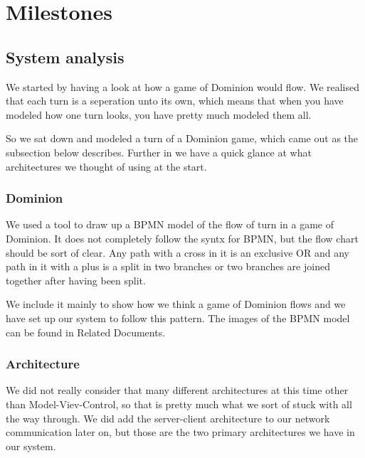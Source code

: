 \section{Milestones}
\subsection{System analysis}
We started by having a look at how a game of Dominion would flow. We realised that each turn is a seperation unto its own, which means that when you have modeled how one turn looks, you have pretty much modeled them all. 

So we sat down and modeled a turn of a Dominion game, which came out as the subsection below describes. Further in we have a quick glance at what architectures we thought of using at the start.
\subsubsection{Dominion}
We used a tool to draw up a BPMN model of the flow of turn in a game of Dominion. It does not completely follow the syntx for BPMN, but the flow chart should be sort of clear. Any path with a cross in it is an exclusive OR and any path in it with a plus is a split in two branches or two branches are joined together after having been split. 

We include it mainly to show how we think a game of Dominion flows and we have set up our system to follow this pattern. The images of the BPMN model can be found in Related Documents.
\subsubsection{Architecture}
We did not really consider that many different architectures at this time other than Model-Viev-Control, so that is pretty much what we sort of stuck with all the way through. We did add the server-client architecture to our network communication later on, but those are the two primary architectures we have in our system.